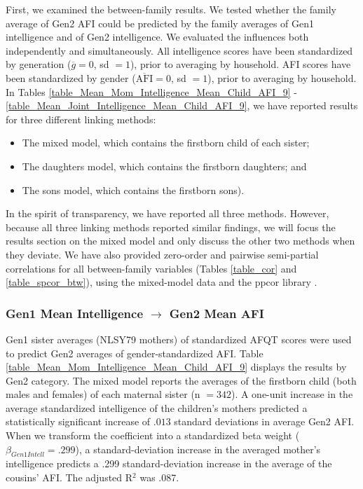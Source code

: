First, we examined the between-family results. We tested whether the family average of Gen2 AFI could be predicted by the family averages of Gen1 intelligence and of Gen2 intelligence. We evaluated the influences both independently and simultaneously. All intelligence scores have been standardized by generation ($\overline{g} = 0$, sd $= 1$), prior to averaging by household. AFI scores have been standardized by gender ($\overline{\mathrm{AFI}} = 0$, sd $= 1$), prior to averaging by household. In Tables \ref{table_Mean_Mom_Intelligence_Mean_Child_AFI_9} - \ref{table_Mean_Joint_Intelligence_Mean_Child_AFI_9}, we have reported results for three different linking methods:
\begin{itemize} 
\item The mixed model, which contains the firstborn child of each sister;
\item The daughters model, which contains the firstborn daughters; and 
\item The sons model, which contains the firstborn sons).\end{itemize}
In the spirit of transparency, we have reported all three methods. However, because all three linking methods reported similar findings, we will focus the results section on the mixed model and only discuss the other two methods when they deviate. We have also provided zero-order and pairwise semi-partial correlations for all between-family variables (Tables \ref{table_cor} and \ref{table_spcor_btw}), using the mixed-model data and the ppcor \R library \citep{kim2015ppcor}.

\subsubsection{Gen1 Mean Intelligence $\rightarrow$ Gen2 Mean AFI} Gen1 sister averages (NLSY79 mothers) of standardized AFQT scores were used to predict Gen2 averages of gender-standardized AFI. Table \ref{table_Mean_Mom_Intelligence_Mean_Child_AFI_9} displays the results by Gen2 category. The mixed model reports the averages of the firstborn child (both males and females) of each maternal sister (n $= 342$). A one-unit increase in the average standardized intelligence of the children's mothers predicted a statistically significant increase of $.013$ standard deviations in average Gen2 AFI. When we transform the coefficient into a standardized beta weight ($\beta_{Gen1 Intell} = .299$), a standard-deviation increase in the averaged mother's intelligence predicts a .299 standard-deviation increase in the average of the cousins' AFI. The adjusted R$^{2}$ was .087.

